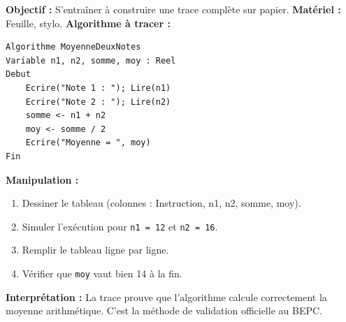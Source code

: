 \documentclass[11pt]{article}
\begin{document}
\begin{experience}
\textbf{Objectif :} S'entraîner à construire une trace complète sur papier.
\textbf{Matériel :} Feuille, stylo.
\textbf{Algorithme à tracer :}
\begin{lstlisting}
Algorithme MoyenneDeuxNotes
Variable n1, n2, somme, moy : Reel
Debut
    Ecrire("Note 1 : "); Lire(n1)
    Ecrire("Note 2 : "); Lire(n2)
    somme <- n1 + n2
    moy <- somme / 2
    Ecrire("Moyenne = ", moy)
Fin
\end{lstlisting}
\textbf{Manipulation :}
\begin{enumerate}
\item Dessiner le tableau (colonnes : Instruction, n1, n2, somme, moy).
\item Simuler l'exécution pour \texttt{n1 = 12} et \texttt{n2 = 16}.
\item Remplir le tableau ligne par ligne.
\item Vérifier que \texttt{moy} vaut bien 14 à la fin.
\end{enumerate}
\textbf{Interprétation :} La trace prouve que l'algorithme calcule correctement la moyenne arithmétique. C'est la méthode de validation officielle au BEPC.
\end{experience}
\end{document}
